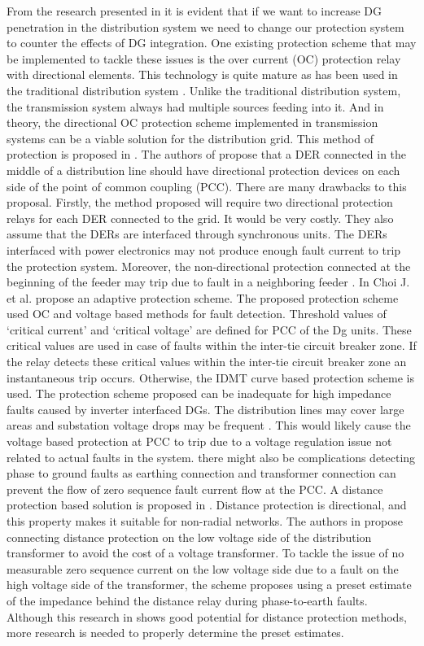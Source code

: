 From the research presented in \cite{PR137} it is evident that if we want to increase DG penetration in the distribution system we need to change our protection system to counter the effects of DG integration. One existing protection scheme that may be implemented to tackle these issues is the over current (OC) protection relay with directional elements. This technology is quite mature as has been used in the traditional distribution system \cite{PR137}. Unlike the traditional distribution system, the transmission system always had multiple sources feeding into it. And in theory, the directional OC protection scheme implemented in transmission systems can be a viable solution for the distribution grid. This method of protection is proposed in \cite{PR138}. The authors of  \cite{PR138} propose that  a DER connected in the middle of a distribution line should have directional protection devices on each side of the point of common coupling (PCC). There are many drawbacks to this proposal. Firstly, the method proposed will require two directional protection relays for each DER connected to the grid. It would be very costly. They also assume that the DERs are interfaced through synchronous units. The DERs interfaced with power electronics may not produce enough fault current to trip the protection system.  Moreover, the non-directional protection connected at the beginning of the feeder may trip due to fault in a neighboring feeder  \cite{PR137}.
 In \cite{PR139} Choi J. et al. propose an adaptive protection scheme. The proposed protection scheme used OC and voltage based methods for fault detection. Threshold values of ‘critical current’ and ‘critical voltage’ are defined for PCC of the Dg units. These critical values are used in case of faults within the inter-tie circuit breaker zone. If the relay detects these critical values within the inter-tie circuit breaker zone an instantaneous trip occurs. Otherwise, the IDMT curve based protection scheme is used. The protection scheme proposed can be inadequate for high impedance faults caused by inverter interfaced DGs. The distribution lines may cover large areas and substation voltage drops may be frequent \cite{PR137}. This would likely cause the voltage based protection at PCC to trip due to a voltage regulation issue not related to actual faults in the system. there might also be complications detecting phase to ground faults as earthing connection and transformer connection can prevent the flow of zero sequence fault current flow at the PCC.
A distance protection based solution is proposed in \cite{PR140}. Distance protection is directional, and this property makes it suitable for non-radial networks. The authors in \cite{PR140} propose connecting distance protection on the low voltage side of the distribution transformer to avoid the cost of a voltage transformer. To tackle the issue of no measurable zero sequence current on the low voltage side due to a fault on the high voltage side of the transformer, the scheme proposes using a preset estimate of the impedance behind the distance relay during phase-to-earth faults. Although this research in \cite{PR140} shows good potential for distance protection methods, more research is needed to properly determine the preset estimates.
